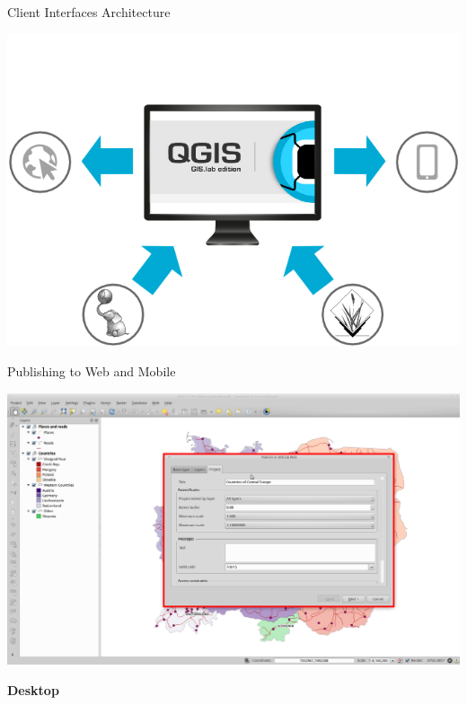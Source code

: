 \documentclass[12pt]{beamer}
\begin{document}
\begin{frame}[plain]{Client Interfaces Architecture}
	\begin{center}
		\includegraphics[keepaspectratio=true,width=\textwidth]{images/gislab-client-interfaces.png}
	\end{center}
\end{frame}

\begin{frame}[plain]{Publishing to Web and Mobile}
	\begin{center}
		\includegraphics[keepaspectratio=true,width=\textwidth]{images/gislab-publish.png}
	\end{center}
\end{frame}


\begin{frame}
	\begin{center}
		\LARGE\textbf{Desktop}	
	\end{center}
\end{frame}
\end{document}
